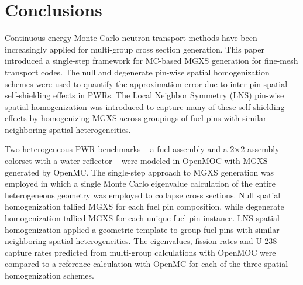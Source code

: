 \section{Conclusions}
\label{sec:conclusions}

Continuous energy Monte Carlo neutron transport methods have been increasingly applied for multi-group cross section generation. This paper introduced a single-step framework for MC-based MGXS generation for fine-mesh transport codes. The null and degenerate pin-wise spatial homogenization schemes were used to quantify the approximation error due to inter-pin spatial self-shielding effects in PWRs. The Local Neighbor Symmetry (LNS) pin-wise spatial homogenization was introduced to capture many of these self-shielding effects by homogenizing MGXS across groupings of fuel pins with similar neighboring spatial heterogeneities.


Two heterogeneous PWR benchmarks -- a fuel assembly and a 2$\times$2 assembly colorset with a water reflector -- were modeled in OpenMOC with MGXS generated by OpenMC. The single-step approach to MGXS generation was employed in which a single Monte Carlo eigenvalue calculation of the entire heterogeneous geometry was employed to collapse cross sections. Null spatial homogenization tallied MGXS for each fuel pin composition, while degenerate homogenization tallied MGXS for each unique fuel pin instance. LNS spatial homogenization applied a geometric template to group fuel pins with similar neighboring spatial heterogeneities. The eigenvalues, fission rates and U-238 capture rates predicted from multi-group calculations with OpenMOC were compared to a reference calculation with OpenMC for each of the three spatial homogenization schemes.


